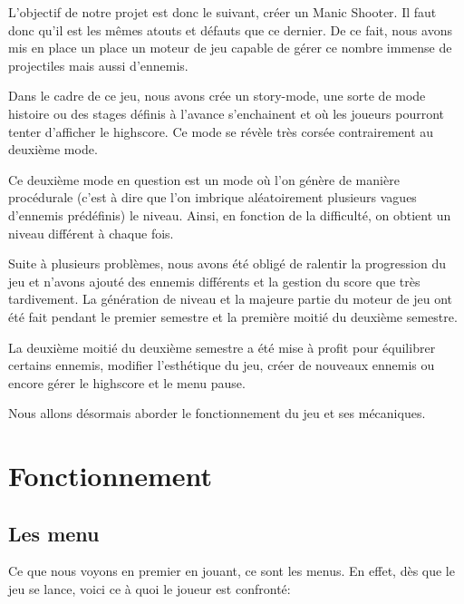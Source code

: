 \documentclass{article}
\begin{document}
L'objectif de notre projet est donc le suivant, créer un Manic Shooter. Il faut donc qu'il est les mêmes atouts et défauts que ce dernier. De ce fait, nous avons mis en place un place un moteur de jeu capable de gérer ce nombre immense de projectiles mais aussi d'ennemis. \newline

Dans le cadre de ce jeu, nous avons crée un story-mode, une sorte de mode histoire ou des stages définis à l'avance s'enchainent et où les joueurs pourront tenter d'afficher le highscore. Ce mode se révèle très corsée contrairement au deuxième mode. \newline

Ce deuxième mode en question est un mode où l'on génère de manière procédurale (c'est à dire que l'on imbrique aléatoirement plusieurs vagues d'ennemis prédéfinis) le niveau. Ainsi, en fonction de la difficulté, on obtient un niveau différent à chaque fois. \newline

Suite à plusieurs problèmes, nous avons été obligé de ralentir la progression du jeu et n'avons ajouté des ennemis différents et la gestion du score que très tardivement. La génération de niveau et la majeure partie du moteur de jeu ont été fait pendant le premier semestre et la première moitié du deuxième semestre. \newline

La deuxième moitié du deuxième semestre a été mise à profit pour équilibrer certains ennemis, modifier l'esthétique du jeu, créer de nouveaux ennemis ou encore gérer le highscore et le menu pause. \newline

Nous allons désormais aborder le fonctionnement du jeu et ses mécaniques. \newpage

\section{Fonctionnement}

\subsection{Les menu}

Ce que nous voyons en premier en jouant, ce sont les menus. En effet, dès que le jeu se lance, voici ce à quoi le joueur est confronté:
\end{document}
